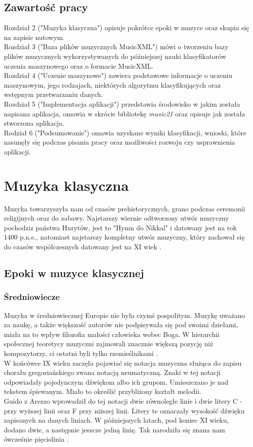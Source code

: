\documentclass[printmode, eng, openany]{mgr}
\newcommand\tab[1][1cm]{\hspace*{#1}}
\begin{document}
\section{Zawartość pracy}
\tab Rozdział 2 ("Muzyka klasyczna") opisuje pokrótce epoki w muzyce oraz skupia się na zapisie nutowym.\\
\tab Rozdział 3 ("Baza plików muzycznych MusicXML") mówi o tworzeniu bazy plików muzycznych wykorzystywanych do późniejszej nauki klasyfikatorów uczenia maszynowego oraz o formacie MusicXML.\\ 
\tab Rozdział 4 ("Uczenie maszynowe") zawiera podstawowe informacje o uczeniu maszynowym, jego rodzajach, niektórych algorytmu klasyfikujących oraz wstępnym przetwarzaniu danych.\\ 
\tab Rozdział 5 ("Implementacja aplikacji") przedstawia środowisko w jakim została napisana aplikacja, omawia w skrócie bibliotekę \textit{music21} oraz opisuje jak została stworzona aplikacja.\\ 
\tab Rodział 6 ("Podsumowanie") omawia uzyskane wyniki klasyfikacji, wnioski, które nasunęły się podczas pisania pracy oraz możliwości rozwoju czy usprawnienia aplikacji. \\ 
\chapter{Muzyka klasyczna}
\tab Muzyka towarzyszyła nam od czasów prehistorycznych, grano podczas ceremonii religijnych oraz do zabawy. Najstarszy wiernie odtworzony utwór muzyczny pochodzi\linebreak z państwa Hurytów, jest to "Hymn do Nikkal" i datowany jest na rok 1400 p.n.e., natomiast najstarszy kompletny utwór muzyczny, który zachował się do czasów współczesnych datowany jest na XI wiek  \cite{oldest}.
\section{Epoki w muzyce klasycznej}
\subsection{Średniowiecze}
\tab Muzyka w średniowiecznej Europie nie była czymś pospolitym. Muzykę uważano za naukę, a także większość autorów nie podpisywała się pod swoimi dziełami, miała na to wpływ filozofia małości człowieka wobec Boga. W hierarchii społecznej teoretycy muzyczni zajmowali znacznie większą pozycję niż kompozytorzy, ci ostatni byli tylko rzemieślnikami \cite{sred}.  \\
\tab W końcówce IX wieku zaczęła pojawiać się notacja muzyczna służąca do zapisu chorału gregoriańskiego zwana notacją neumatyczną. Znaki w tej notacji odpowiadały pojedynczym dźwiękom albo ich grupom. Umieszczano je nad tekstem śpiewanym. Miało to określić przybliżony kształt melodii. \\
\tab Guido z Arezzo wprowadził do tej notacji dwie równoległe linie i dwie litery C - przy wyższej linii oraz F przy niższej linii. Litery te oznaczały wysokość dźwięku zapisanych na danych liniach. W późniejszych latach, pod koniec XI wieku, dodano dwie, a następnie jeszcze jedną linię. Tak narodziła się znana nam ówcześnie pięciolinia \cite{neum}. 
\end{document}
